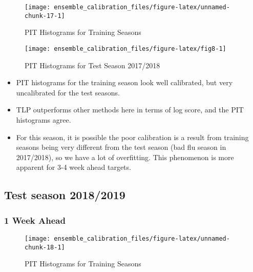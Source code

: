 \documentclass[
]{article}
\begin{document}
\begin{figure}[H]

{\centering \texttt{[image: ensemble\_calibration\_files/figure-latex/unnamed-chunk-17-1]} 

}

\caption{PIT Histograms for Training Seasons}\label{fig:unnamed-chunk-17}
\end{figure}

\newpage

\begin{figure}[H]

{\centering \texttt{[image: ensemble\_calibration\_files/figure-latex/fig8-1]} 

}

\caption{PIT Histograms for Test Season 2017/2018}\label{fig:fig8}
\end{figure}

\begin{itemize}
\item PIT histograms for the training season look well calibrated, but very uncalibrated for the test seasons.
\item TLP outperforms other methods here in terms of log score, and the PIT histograms agree.
\item For this season, it is possible the poor calibration is a result from training seasons being very different from the test season (bad flu season in 2017/2018), so we have a lot of overfitting. This phenomenon is more apparent for 3-4 week ahead targets.
\end{itemize}

\newpage

\hypertarget{test-season-20182019}{%
\subsection{Test season 2018/2019}\label{test-season-20182019}}

\hypertarget{week-ahead-8}{%
\subsubsection{1 Week Ahead}\label{week-ahead-8}}

\begin{figure}[H]

{\centering \texttt{[image: ensemble\_calibration\_files/figure-latex/unnamed-chunk-18-1]} 

}

\caption{PIT Histograms for Training Seasons}\label{fig:unnamed-chunk-18}
\end{figure}
\end{document}
